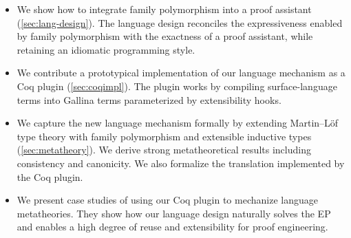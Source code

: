 \begin{itemize}[leftmargin=3.5ex]

\item We show how to integrate family polymorphism into a proof
assistant (\cref{sec:lang-design}).
The language design reconciles the expressiveness enabled by
family polymorphism with the exactness of a proof assistant,
while retaining an idiomatic programming style.

\item We contribute a prototypical implementation of our language
mechanism as a Coq plugin (\cref{sec:coqimpl}). The plugin works by
compiling surface-language terms into Gallina terms parameterized by
extensibility hooks.

\item We capture the new language mechanism formally by extending
Martin–Löf type theory with family polymorphism and extensible inductive
types (\cref{sec:metatheory}).
We derive strong meta\-theoretical results including consistency and
canonicity.
We also formalize the translation implemented by the Coq plugin.

\item We present case studies of using our Coq plugin to mechanize
language metatheories.
They show how our language design naturally solves the EP and
enables a high degree of reuse and extensibility
for proof engineering.

\end{itemize}



